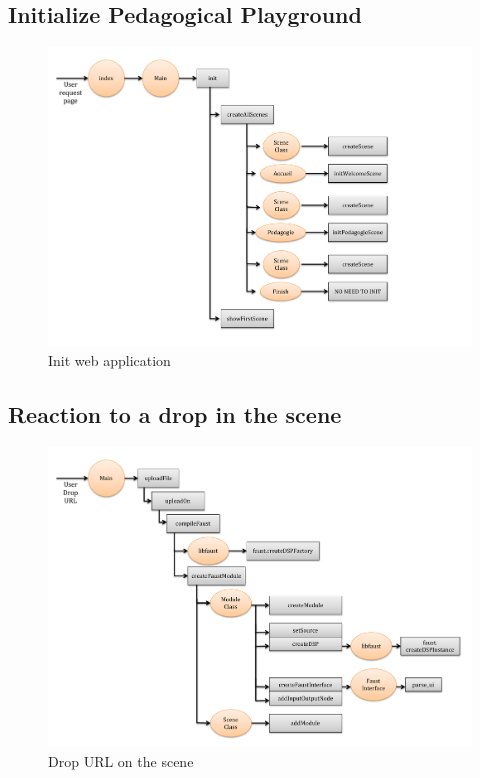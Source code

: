 \documentclass[a4paper]{article}
\begin{document}
\subsection{Initialize Pedagogical Playground}
\begin{figure}[!h]
\begin{center}
\includegraphics[width=\columnwidth]{images/ScenarioInit.pdf}
\caption{Init web application}
\label{fig:classes}
\end{center}
\end{figure}

\newpage
\subsection{Reaction to a drop in the scene}
\begin{figure}[!h]
\begin{center}
\includegraphics[width=\columnwidth]{images/ScenarioDrop.pdf}
\caption{Drop URL on the scene}
\label{fig:classes}
\end{center}
\end{figure}
\end{document}
